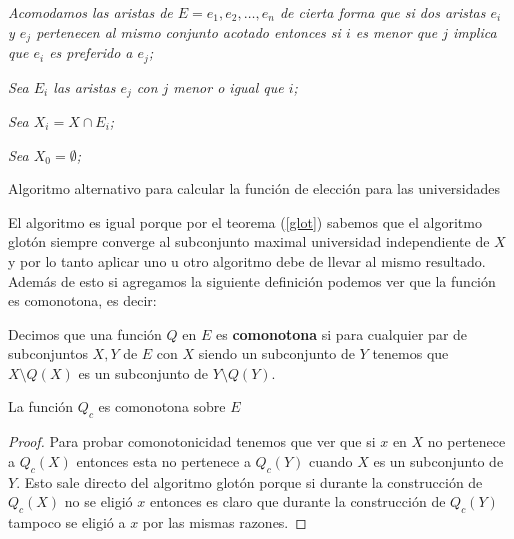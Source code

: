 \IncMargin{1em}
\begin{Algoritmo}[H]

\BlankLine
\emph{Acomodamos las aristas de $E=e_1,e_2,\dots,e_n$ de cierta forma que si dos aristas $e_i$ y $e_j$ pertenecen al mismo conjunto acotado entonces si $i$ es menor que $j$ implica que $e_i$ es preferido a $e_j$;}

\emph{Sea $E_i$ las aristas $e_j$ con $j$ menor o igual que $i$;}

\emph{Sea $X_i=X \cap E_i$;}

\emph{Sea $X_0 = \emptyset$;}


\caption{Algoritmo alternativo para calcular la función de elección para las universidades}
\end{Algoritmo}
\DecMargin{1em}

El algoritmo es igual porque por el teorema (\ref{glot}) sabemos que el algoritmo glotón siempre converge al subconjunto maximal universidad independiente de $X$ y por lo tanto aplicar uno u otro algoritmo debe de llevar al mismo resultado. Además de esto si agregamos la siguiente definición podemos ver que la función es comonotona, es decir:

\begin{dfn}
Decimos que una función $Q$ en $E$ es \textbf{comonotona} si para cualquier par de subconjuntos $X,Y$ de $E$ con $X$ siendo un subconjunto de $Y$ tenemos que $X\setminus Q(X)$ es un subconjunto de $Y\setminus Q(Y)$.
\end{dfn}

\begin{cor}
La función $Q_c$ es comonotona sobre $E$
\end{cor}

\begin{proof}
Para probar comonotonicidad tenemos que ver que si $x$ en $X$ no pertenece a $Q_c(X)$ entonces esta no pertenece a $Q_c(Y)$ cuando $X$ es un subconjunto de $Y$. Esto sale directo del algoritmo glotón porque si durante la construcción de $Q_c(X)$ no se eligió $x$ entonces es claro que durante la construcción de $Q_c(Y)$ tampoco se eligió a $x$ por las mismas razones. 
\end{proof}

